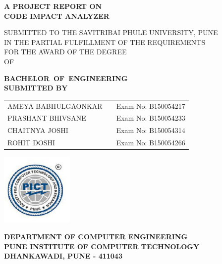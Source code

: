 \documentclass[oneside,a4paper,12pt]{book}
\begin{document}
\setlength{\parindent}{0mm}
\begin{center}
{\bfseries A PROJECT REPORT ON \\}
 \vspace*{2\baselineskip}
{\bfseries \fontsize{16}{15} \selectfont CODE IMPACT ANALYZER \\ \vspace*{2\baselineskip}}
{\fontsize{12}{12} \selectfont SUBMITTED TO THE SAVITRIBAI PHULE UNIVERSITY, PUNE
 \\ IN THE PARTIAL FULFILLMENT OF THE REQUIREMENTS \\ FOR THE AWARD OF THE DEGREE  \\
 \vspace*{1\baselineskip}
 OF

\vspace*{2\baselineskip}}
{\bfseries \fontsize{16}{12} \selectfont\mbox{BACHELOR OF ENGINEERING}\\  
{\bfseries \fontsize{12}{12} \selectfont SUBMITTED BY \\ 
\vspace*{2\baselineskip}} 
{\bfseries \fontsize{12}{12} \selectfont
\begin{center}
\begin{tabular}{ l c c }
 AMEYA BABHULGAONKAR &  & Exam No: B150054217 \\ 
\quad PRASHANT BHIVSANE&  & Exam No: B150054233\\  
\quad \quad CHAITNYA JOSHI &  & Exam No: B150054314\\
\quad \quad \quad ROHIT DOSHI &  & Exam No: B150054266\\
 

\end{tabular}
\end{center}

\vspace*{1\baselineskip}}

\includegraphics[width=100pt]{collegelogo.png} \\
\vskip 0.5cm
{\bfseries \fontsize{16}{15} \selectfont
{\bfseries \fontsize{12}{12} \selectfont 
DEPARTMENT OF COMPUTER ENGINEERING\\
\vspace*{1\baselineskip}
PUNE INSTITUTE OF COMPUTER TECHNOLOGY \\
\vspace*{1\baselineskip}
DHANKAWADI, PUNE - 411043

}}}
\end{center}
\end{document}
